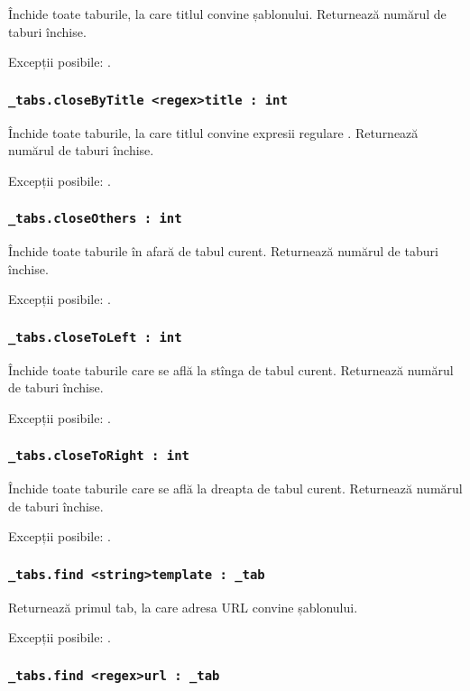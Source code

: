 Închide toate taburile, la care titlul convine șablonului. Returnează numărul de taburi închise.

Excepții posibile: .

\subsubsection{\lstinline|_tabs.closeByTitle <regex>title : int|}

Închide toate taburile, la care titlul convine expresii regulare . Returnează numărul de taburi închise.

Excepții posibile: .

\subsubsection{\lstinline|_tabs.closeOthers : int|}

Închide toate taburile în afară de tabul curent. Returnează numărul de taburi închise.

Excepții posibile: .

\subsubsection{\lstinline|_tabs.closeToLeft : int|}

Închide toate taburile care se află la stînga de tabul curent. Returnează numărul de taburi închise.

Excepții posibile: .

\subsubsection{\lstinline|_tabs.closeToRight : int|}

Închide toate taburile care se află la dreapta de tabul curent. Returnează numărul de taburi închise.

Excepții posibile: .

\subsubsection{\lstinline|_tabs.find <string>template : _tab|}

Returnează primul tab, la care adresa URL convine șablonului.

Excepții posibile: .

\subsubsection{\lstinline|_tabs.find <regex>url : _tab|}

